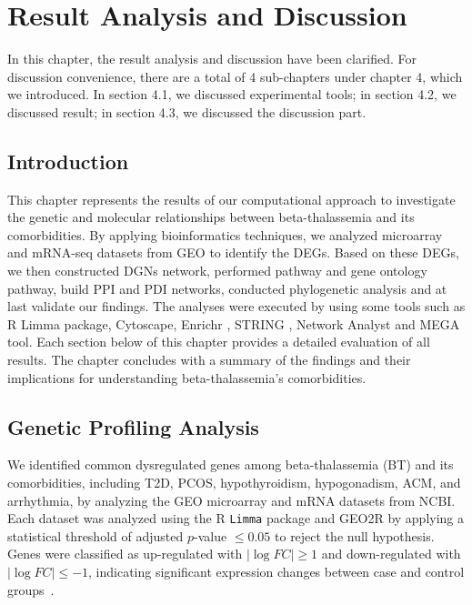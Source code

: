 %
%
\let\textcircled=\pgftextcircled
\chapter{Result Analysis and Discussion}
\label{chap:implementation}
In this chapter, the result analysis and discussion have been clarified. For discussion convenience, there are a total of 4 sub-chapters under chapter 4, which we introduced. In section 4.1, we discussed experimental tools;  in section 4.2, we discussed result;  in section 4.3, we discussed the discussion part.

\vspace{150mm}

\section{Introduction}
\label{sec:sec4_1}
This chapter represents the results of our computational approach to investigate the genetic and molecular relationships between beta-thalassemia and its comorbidities. By applying bioinformatics techniques, we analyzed microarray and mRNA-seq datasets from GEO to identify the DEGs. Based on these DEGs, we then constructed DGNs network, performed pathway and gene ontology pathway, build PPI and PDI networks, conducted phylogenetic analysis and at last validate our findings. The analyses were executed by using some tools such as R Limma package, Cytoscape, Enrichr \cite{b15}, STRING \cite{b15}, Network Analyst \cite{b15} and MEGA tool. Each section below of this chapter provides a detailed evaluation of all results. The chapter concludes with a summary of the findings and their implications for understanding beta-thalassemia's comorbidities.


\section{Genetic Profiling Analysis}
\label{sec:sec4_2}

We identified common dysregulated genes among beta-thalassemia (BT) and its comorbidities, including T2D, PCOS, hypothyroidism, hypogonadism, ACM, and arrhythmia, by analyzing the GEO microarray and mRNA datasets from NCBI. Each dataset was analyzed using the R \texttt{Limma} package and GEO2R by applying a statistical threshold of adjusted \( p \)-value \( \leq 0.05 \) to reject the null hypothesis. Genes were classified as up-regulated with \( \left| \log FC \right| \geq 1 \) and down-regulated with \( \left| \log FC \right| \leq -1 \), indicating significant expression changes between case and control groups~\cite{b4}.

